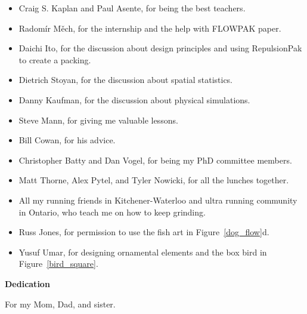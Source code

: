 \begin{itemize}  
\item Craig S. Kaplan and Paul Asente, for being the best teachers.
\item Radom\'ir M\v{e}ch, for the internship and the help with FLOWPAK paper. 
\item Daichi Ito, for the discussion about design principles and using RepulsionPak to create a packing.
\item Dietrich Stoyan, for the discussion about spatial statistics.
\item Danny Kaufman, for the discussion about physical simulations.
\item Steve Mann, for giving me valuable lessons.
\item Bill Cowan, for his advice.
\item Christopher Batty and Dan Vogel, for being my PhD committee members.
\item Matt Thorne, Alex Pytel, and Tyler Nowicki, for all the lunches together. 
\item All my running friends in Kitchener-Waterloo and ultra running community in \mbox{Ontario}, 
who teach me on how to keep grinding.
\item Russ Jones, for permission to use the fish art in Figure~\ref{dog_flow}d.
\item Yusuf Umar, for designing ornamental elements and the box bird in Figure~\ref{bird_square}.
\end{itemize}

\cleardoublepage


\begin{center}\textbf{Dedication}\end{center}

For my Mom, Dad, and sister.
\cleardoublepage

\renewcommand\contentsname{Table of Contents}
\tableofcontents
\cleardoublepage
{}    %

\listoftables
\cleardoublepage
{}		%

\listoffigures
\cleardoublepage
{}		%

\printglossaries
\cleardoublepage
{}		%


